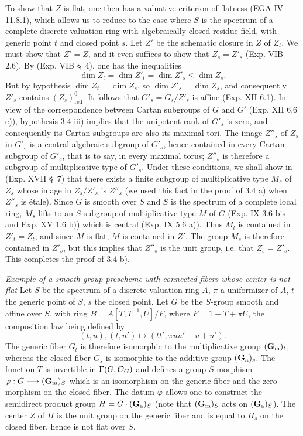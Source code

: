 To show that $Z$ is flat, one then has a valuative criterion of flatness (EGA IV 11.8.1), which allows us to reduce to the case where $S$ is the spectrum of a complete discrete valuation ring with algebraically closed residue field, with generic point $t$ and closed point $s$. Let $Z'$ be the schematic closure in $Z$ of $Z_t$. We must show that $Z'=Z$, and it even suffices to show that $Z_s=Z'_s$ (Exp. VIB 2.6). By (Exp. VIB \S\ 4), one has the inequalities
\[
\dim Z_t=\dim Z'_t=\dim Z'_s\leq\dim Z_s.
\]
But by hypothesis $\dim Z_t=\dim Z_s$, so $\dim Z'_s=\dim Z_s$, and consequently $Z'_s$ contains $(Z_s)^0_{\mathrm{red}}$. It follows that $G'_s=G_s/Z'_s$ is affine (Exp. XII 6.1). In view of the correspondence between Cartan subgroups of $G$ and $G'$ (Exp. XII 6.6 e)), hypothesis 3.4 iii) implies that the unipotent rank of $G'_s$ is zero, and consequently its Cartan subgroups are also its maximal tori. The image $Z''_s$ of $Z_s$ in $G'_s$ is a central algebraic subgroup of $G'_s$, hence contained in every Cartan subgroup of $G'_s$, that is to say, in every maximal torus; $Z''_s$ is therefore a subgroup of multiplicative type of $G'_s$. Under these conditions, we shall show in (Exp. XVII \S\ 7) that there exists a finite subgroup of multiplicative type $M_s$ of $Z_s$ whose image in $Z_s/Z'_s$ is $Z''_s$ (we used this fact in the proof of 3.4 a) when $Z''_s$ is étale). Since $G$ is smooth over $S$ and $S$ is the spectrum of a complete local ring, $M_s$ lifts to an $S$-subgroup of multiplicative type $M$ of $G$ (Exp. IX 3.6 bis and Exp. XV 1.6 b)) which is central (Exp. IX 5.6 a)). Thus $M_t$ is contained in $Z'_t=Z_t$, and since $M$ is flat, $M$ is contained in $Z'$. The group $M_s$ is therefore contained in $Z'_s$, but this implies that $Z''_s$ is the unit group, i.e. that $Z_s=Z'_s$. This completes the proof of 3.4 b).

\par\noindent\emph{Example of a smooth group prescheme with connected fibers whose center is not flat}
Let $S$ be the spectrum of a discrete valuation ring $A$, $\pi$ a uniformizer of $A$, $t$ the generic point of $S$, $s$ the closed point. Let $G$ be the $S$-group smooth and affine over $S$, with ring $B=A[T,T^{-1},U]/F$, where $F=1-T+\pi U$, the composition law being defined by
\[
(t,u),(t,u')\longmapsto(tt',\pi uu'+u+u').
\]
The generic fiber $G_t$ is therefore isomorphic to the multiplicative group $(\mathbf{G}_{\mathrm{m}})_t$, whereas the closed fiber $G_s$ is isomorphic to the additive group $(\mathbf{G}_{\mathrm{a}})_s$. The function $T$ is invertible in $\Gamma(G,\mathcal{O}_G)$ and defines a group $S$-morphism $\varphi:G\longrightarrow(\mathbf{G}_{\mathrm{m}})_S$ which is an isomorphism on the generic fiber and the zero morphism on the closed fiber. The datum $\varphi$ allows one to construct the semidirect product group $H=G\cdot(\mathbf{G}_{\mathrm{a}})_S$ (note that $(\mathbf{G}_{\mathrm{m}})_S$ acts on $(\mathbf{G}_{\mathrm{a}})_S$). The center $Z$ of $H$ is the unit group on the generic fiber and is equal to $H_s$ on the closed fiber, hence is not flat over $S$.

